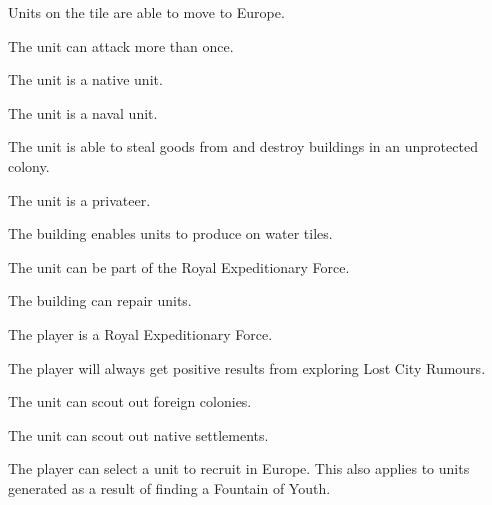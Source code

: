 \documentclass[12pt]{book}
\begin{document}
Units on the tile are able to move to Europe.

\affectsUnit

The unit can attack more than once.

\affectsUnit

The unit is a native unit.

\affectsUnit

The unit is a naval unit.

\affectsUnit

The unit is able to steal goods from and destroy buildings in an
unprotected colony.

\affectsUnit

The unit is a privateer.

\affectsBuilding

The building enables units to produce on water tiles.

\affectsUnit

The unit can be part of the Royal Expeditionary Force.

\affectsBuilding

The building can repair units.

\affectsPlayer

The player is a Royal Expeditionary Force.

\affectsPlayer

The player will always get positive results from exploring Lost City
Rumours.

\affectsUnit

The unit can scout out foreign colonies.

\affectsUnit

The unit can scout out native settlements.

\affectsPlayer

The player can select a unit to recruit in Europe. This also applies
to units generated as a result of finding a Fountain of Youth.

\affectsBuilding
\end{document}
